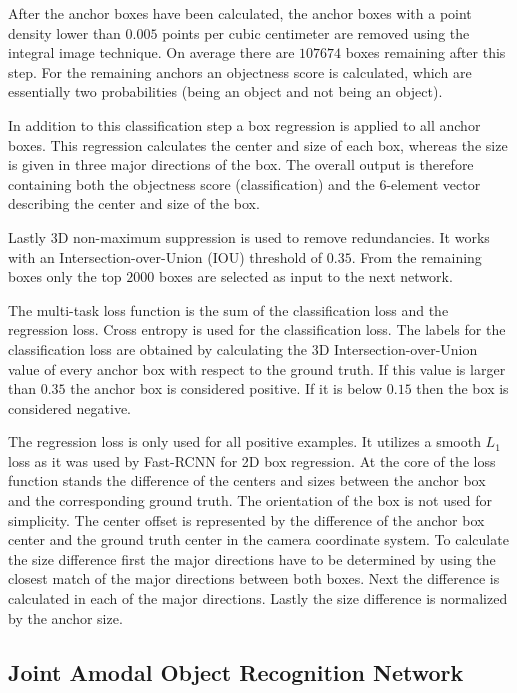 \documentclass[12pt]{scrartcl}
\begin{document}
After the anchor boxes have been calculated, the anchor boxes with a point density
lower than \(0.005\) points per cubic centimeter are removed using the integral
image technique. On average there are \(107674\) boxes remaining after this step.
For the remaining anchors an objectness score is calculated, which are essentially
two probabilities (being an object and not being an object).

In addition to this classification step a box regression is applied to all
anchor boxes. This regression calculates the center and size of each
box, whereas the size is given in three major directions of the box.
The overall output is therefore containing both the objectness score (classification)
and the 6-element vector describing the center and size of the box.

Lastly 3D non-maximum suppression is used to remove redundancies. It works with
an Intersection-over-Union (IOU) threshold of \(0.35\). From the remaining
boxes only the top \(2000\) boxes are selected as input to the next network.

The multi-task loss function is the sum of the classification loss and the
regression loss. Cross entropy is used for the classification loss.
The labels for the classification loss are obtained by calculating the 3D
Intersection-over-Union value of every anchor box with respect to the ground truth.
If this value is larger than \(0.35\) the anchor box is considered positive. If
it is below \(0.15\) then the box is considered negative.

The regression loss is only used for all positive examples. It utilizes a smooth
\(L_1\) loss as it was used by Fast-RCNN\cite{Girshick2015} for 2D box regression.
At the core of the loss function stands the difference of the centers and sizes
between the anchor box and the corresponding ground truth. The orientation of
the box is not used for simplicity. The center offset is represented
by the difference of the anchor box center and the ground truth center in the
camera coordinate system. To calculate the size difference first the major directions
have to be determined by using the closest match of the major directions between
both boxes. Next the difference is calculated in each of the major directions.
Lastly the size difference is normalized by the anchor size.

\subsection{Joint Amodal Object Recognition Network}
\end{document}
